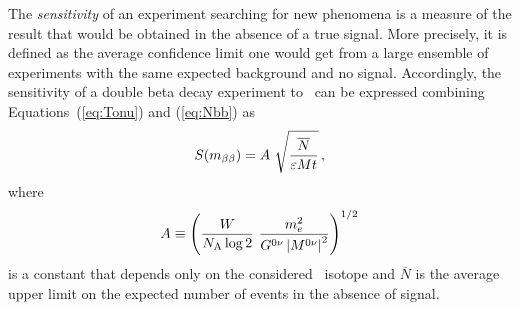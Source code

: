 \documentclass{PoS}
\begin{document}
The \emph{sensitivity} of an experiment searching for new phenomena is a measure of the result that would be obtained in the absence of a true signal. More precisely, it is defined as the average confidence limit one would get from a large ensemble of experiments with the same expected background and no signal. Accordingly, the sensitivity of a double beta decay experiment to \mbb\ can be expressed combining Equations~(\ref{eq:Tonu}) and (\ref{eq:Nbb}) as
\begin{equation}
S(\mbb) = A\ \sqrt{\frac{\overline{N}}{\varepsilon Mt}}\,, \label{eq:Sensitivity1}
\end{equation}
where
\begin{equation}
A \equiv \left(\frac{W}{N_\mathrm{A}\log2}\ \frac{m_{e}^{2}}{\Gonu\Monu^{2}} \right)^{1/2}
\end{equation}
is a constant that depends only on the considered \bb\ isotope and $\overline{N}$ is the average upper limit on the expected number of events in the absence of signal.
\end{document}

